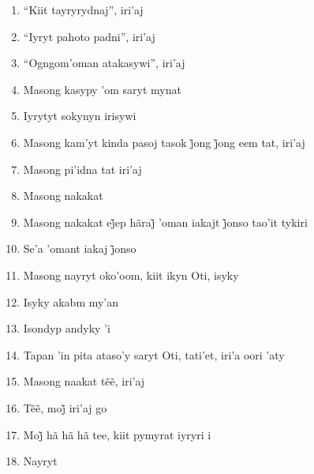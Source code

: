 \begin{enumerate}
 \item ``Kiit tayryrydnaj'', iri'aj

 \item ``Iyryt pahoto padni'', iri'aj

 \item ``Ogngom'oman atakasywi'', iri'aj

 \begin{center}\end{center}

 \item Masong kasypy 'om saryt mynat

 \item Iyrytyt sokynyn irisywi

 \item Masong kam’yt kinda pasoj tasok j̃ong j̃ong eem tat, iri’aj

 \item Masong pi'idna tat iri'aj

 \item Masong nakakat

 \item Masong nakakat ej̃ep hãraj̃ ’oman iakajt j̃onso tao’it tykiri

 \item Se’a ’omant iakaj j̃onso

 \begin{center}\end{center}

 \item Masong nayryt oko'oom, kiit ikyn Oti, isyky

 \item Isyky akabm my'an

 \item Isondyp andyky 'i

 \item Tapan 'in pita ataso'y saryt Oti, tati'et, iri'a oori 'aty

 \item Masong naakat tẽẽ, iri’aj

 \begin{center}\end{center}

 \item Tẽẽ, moj̃ iri’aj go

 \item Moj̃ hã hã hã tee, kiit pymyrat iyryri i

 \item Nayryt


\end{enumerate}
